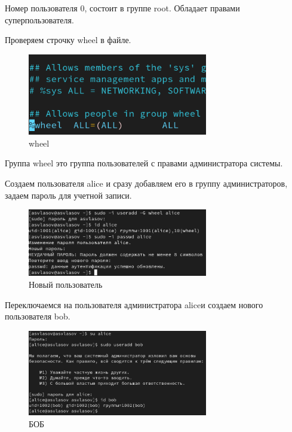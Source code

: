 \documentclass[
  12pt,
  a4paper,
  DIV=11,
  numbers=noendperiod]{scrreprt}
\begin{document}
Номер пользователя 0, состоит в группе root. Обладает правами
суперпользователя.

Проверяем строчку wheel в файле.

\begin{figure}

{\centering \includegraphics[width=0.7\textwidth,height=\textheight]{image/3.png}

}

\caption{wheel}

\end{figure}%

Группа wheel это группа пользователей с правами администратора системы.

Создаем пользователя alice и сразу добавляем его в группу
администраторов, задаем пароль для учетной записи.

\begin{figure}

{\centering \includegraphics[width=0.7\textwidth,height=\textheight]{image/4.png}

}

\caption{Новый пользователь}

\end{figure}%

Переключаемся на пользователя администратора aliceи создаем нового
пользователя bob.

\begin{figure}

{\centering \includegraphics[width=0.7\textwidth,height=\textheight]{image/5.png}

}

\caption{БОБ}

\end{figure}%
\end{document}
